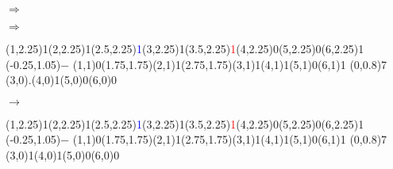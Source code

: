 \documentclass[11pt,a4paper]{article}
\begin{document}
\begin{center}
\begin{table}[ht!]
\begin{minipage}{0.1\textwidth}
$ \Rightarrow $

  \end{minipage}
\end{table}


\begin{table}[ht!]
  \centering
  \begin{minipage}{0.1\textwidth}
  \centering

$ \Rightarrow $

  \end{minipage}
  \hfillx
  \begin{minipage}{0.15\textwidth}

\par\vspace{3\oplineheight}
\oplput(1,2.25){1}\oplput(2,2.25){1}\oplput(2.5,2.25){\scriptsize \textcolor{blue}{1}}\oplput(3,2.25){1}\oplput(3.5,2.25){\scriptsize \textcolor{red}{1}}\oplput(4,2.25){0}\oplput(5,2.25){0}\oplput(6,2.25){1}
\oplput(-0.25,1.05){$-$}
\oplput(1,1){0}\oplput(1.75,1.75){\tiny \textcolor{blue}{}}\oplput(2,1){1}\oplput(2.75,1.75){\tiny \textcolor{red}{}}\oplput(3,1){1}\oplput(4,1){1}\oplput(5,1){0}\oplput(6,1){1}
\ophline(0,0.8){7}
\oplput(3,0){.}\oplput(4,0){1}\oplput(5,0){0}\oplput(6,0){0}

  \end{minipage}
  \hfillx
  \begin{minipage}{0.1\textwidth}
  \centering

$ \rightarrow $

  \end{minipage}
  \hfillx
  \begin{minipage}{0.15\textwidth}

\par\vspace{3\oplineheight}
\oplput(1,2.25){1}\oplput(2,2.25){1}\oplput(2.5,2.25){\scriptsize \textcolor{blue}{1}}\oplput(3,2.25){1}\oplput(3.5,2.25){\scriptsize \textcolor{red}{1}}\oplput(4,2.25){0}\oplput(5,2.25){0}\oplput(6,2.25){1}
\oplput(-0.25,1.05){$-$}
\oplput(1,1){0}\oplput(1.75,1.75){\tiny \textcolor{blue}{}}\oplput(2,1){1}\oplput(2.75,1.75){\tiny \textcolor{red}{}}\oplput(3,1){1}\oplput(4,1){1}\oplput(5,1){0}\oplput(6,1){1}
\ophline(0,0.8){7}
\oplput(3,0){1}\oplput(4,0){1}\oplput(5,0){0}\oplput(6,0){0}

  \end{minipage}
  \hfillx
  \begin{minipage}{0.1\textwidth}
  \centering


\end{minipage}
\end{table}
\end{center}
\end{document}
